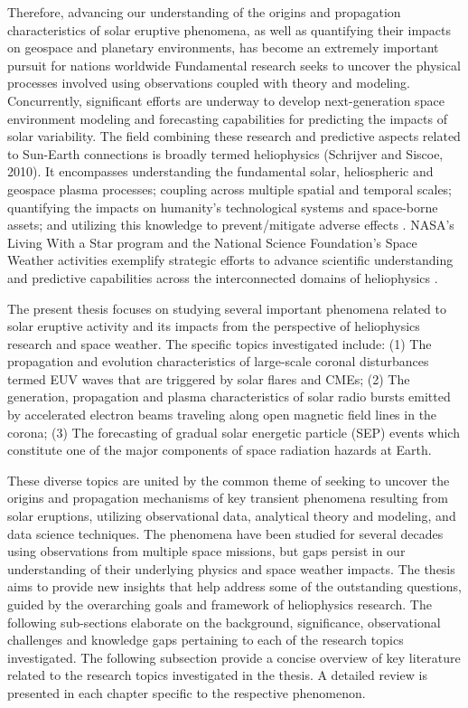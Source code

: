 Therefore, advancing our understanding of the origins and propagation characteristics of solar eruptive phenomena, as well as quantifying their impacts on geospace and planetary environments, has become an extremely important pursuit for nations worldwide Fundamental research seeks to uncover the physical processes involved using observations coupled with theory and modeling. Concurrently, significant efforts are underway to develop next-generation space environment modeling and forecasting capabilities for predicting the impacts of solar variability. The field combining these research and predictive aspects related to Sun-Earth connections is broadly termed heliophysics (Schrijver and Siscoe, 2010). It encompasses understanding the fundamental solar, heliospheric and geospace plasma processes; coupling across multiple spatial and temporal scales; quantifying the impacts on humanity's technological systems and space-borne assets; and utilizing this knowledge to prevent/mitigate adverse effects \citep{schrijver_2015a, schrijver_2015b}. NASA's Living With a Star program and the National Science Foundation's Space Weather activities exemplify strategic efforts to advance scientific understanding and predictive capabilities across the interconnected domains of heliophysics \citep{brewer_2002}.

The present thesis focuses on studying several important phenomena related to solar eruptive activity and its impacts from the perspective of heliophysics research and space weather. The specific topics investigated include: (1) The propagation and evolution characteristics of large-scale coronal disturbances termed EUV waves that are triggered by solar flares and CMEs; (2) The generation, propagation and plasma characteristics of solar radio bursts emitted by accelerated electron beams traveling along open magnetic field lines in the corona; (3) The forecasting of gradual solar energetic particle (SEP) events which constitute one of the major components of space radiation hazards at Earth.

These diverse topics are united by the common theme of seeking to uncover the origins and propagation mechanisms of key transient phenomena resulting from solar eruptions, utilizing observational data, analytical theory and modeling, and data science techniques. The phenomena have been studied for several decades using observations from multiple space missions, but gaps persist in our understanding of their underlying physics and space weather impacts. The thesis aims to provide new insights that help address some of the outstanding questions, guided by the overarching goals and framework of heliophysics research. The following sub-sections elaborate on the background, significance, observational challenges and knowledge gaps pertaining to each of the research topics investigated. The following subsection provide a concise overview of key literature related to the research topics investigated in the thesis. A detailed review is presented in each chapter specific to the respective phenomenon.

